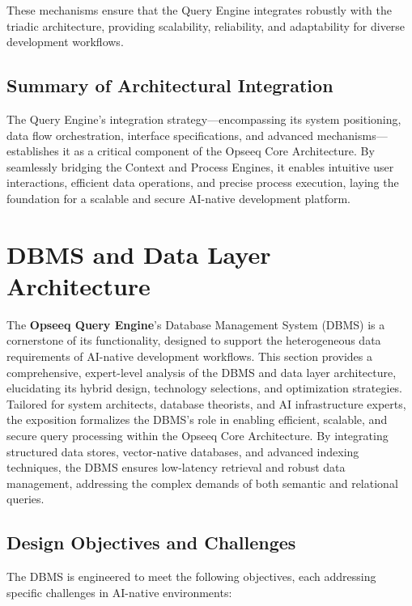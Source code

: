 \documentclass[11pt]{article}
\begin{document}
These mechanisms ensure that the Query Engine integrates robustly with the triadic architecture, providing scalability, reliability, and adaptability for diverse development workflows.

\subsection{Summary of Architectural Integration}
The Query Engine’s integration strategy—encompassing its system positioning, data flow orchestration, interface specifications, and advanced mechanisms—establishes it as a critical component of the Opseeq Core Architecture. By seamlessly bridging the Context and Process Engines, it enables intuitive user interactions, efficient data operations, and precise process execution, laying the foundation for a scalable and secure AI-native development platform.

\section{DBMS and Data Layer Architecture}
\label{sec:dbms}

The \textbf{Opseeq Query Engine}'s Database Management System (DBMS) is a cornerstone of its functionality, designed to support the heterogeneous data requirements of AI-native development workflows. This section provides a comprehensive, expert-level analysis of the DBMS and data layer architecture, elucidating its hybrid design, technology selections, and optimization strategies. Tailored for system architects, database theorists, and AI infrastructure experts, the exposition formalizes the DBMS’s role in enabling efficient, scalable, and secure query processing within the Opseeq Core Architecture. By integrating structured data stores, vector-native databases, and advanced indexing techniques, the DBMS ensures low-latency retrieval and robust data management, addressing the complex demands of both semantic and relational queries.

\subsection{Design Objectives and Challenges}
\label{subsec:dbms_objectives}

The DBMS is engineered to meet the following objectives, each addressing specific challenges in AI-native environments:
\end{document}
